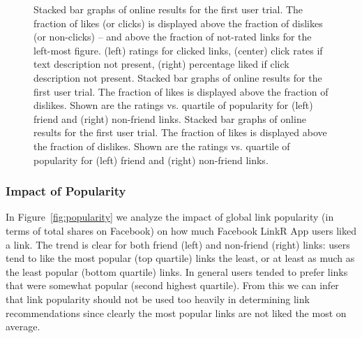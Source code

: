 \begin{figure}[t!]
\hspace{-6mm}
\caption{Stacked bar graphs of online results for the first 
user trial.  The fraction of likes (or clicks) is displayed above 
the fraction of dislikes (or non-clicks) -- and above the fraction of not-rated
links for the left-most figure.  
(left) ratings for clicked links, (center) click rates if
text description not present, 
(right) percentage liked if click description not present.
Stacked bar graphs of online results for the first 
user trial.  The fraction of likes is displayed above the fraction of
dislikes.  Shown are the ratings vs. quartile of popularity for (left)
friend and (right) non-friend links.
Stacked bar graphs of online results for the first 
user trial.  The fraction of likes is displayed above the fraction of
dislikes.  Shown are the ratings vs. quartile of popularity for (left)
friend and (right) non-friend links.
}
\label{fig:click_evidence}
\end{figure}

\subsubsection{Impact of Popularity}

In Figure~\ref{fig:popularity} we analyze the impact of global link
popularity (in terms of total shares on Facebook) 
on how much Facebook LinkR App users liked a link.
The trend is clear for both friend (left) and non-friend (right)
links: users tend to like the most popular (top quartile) 
links the least, or at least as much as the least popular (bottom quartile)
links.  In general users tended to prefer links that were somewhat
popular (second highest quartile).  From this we can infer that
link popularity should not be used too heavily in determining link
recommendations since clearly the most popular links are not liked
the most on average.

